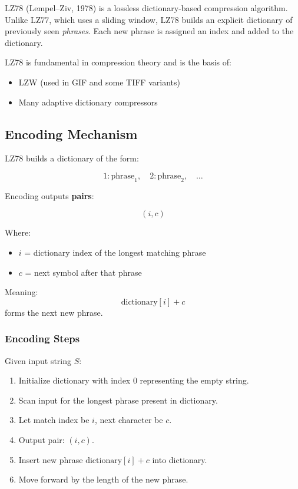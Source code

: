 \documentclass{AnantDocumentation}
\begin{document}
LZ78 (Lempel–Ziv, 1978) is a lossless dictionary-based compression algorithm.  
Unlike LZ77, which uses a sliding window, LZ78 builds an explicit dictionary of previously seen \emph{phrases}.  
Each new phrase is assigned an index and added to the dictionary.

LZ78 is fundamental in compression theory and is the basis of:

\begin{itemize}
\item LZW (used in GIF and some TIFF variants)
\item Many adaptive dictionary compressors
\end{itemize}

\subsection{Encoding Mechanism}

LZ78 builds a dictionary of the form:

\[
1:\text{phrase}_1,\quad 2:\text{phrase}_2,\quad \ldots
\]

Encoding outputs \textbf{pairs}:

\[
(i, c)
\]

Where:
\begin{itemize}
\item \(i\) = dictionary index of the longest matching phrase  
\item \(c\) = next symbol after that phrase
\end{itemize}

Meaning:
\[
\text{dictionary}[i] + c
\]
forms the next new phrase.

\subsubsection{Encoding Steps}

Given input string \(S\):

\begin{enumerate}
\item Initialize dictionary with index 0 representing the empty string.
\item Scan input for the longest phrase present in dictionary.
\item Let match index be \(i\), next character be \(c\).
\item Output pair: \((i, c)\).
\item Insert new phrase \( \text{dictionary}[i] + c \) into dictionary.
\item Move forward by the length of the new phrase.
\end{enumerate}
\end{document}
